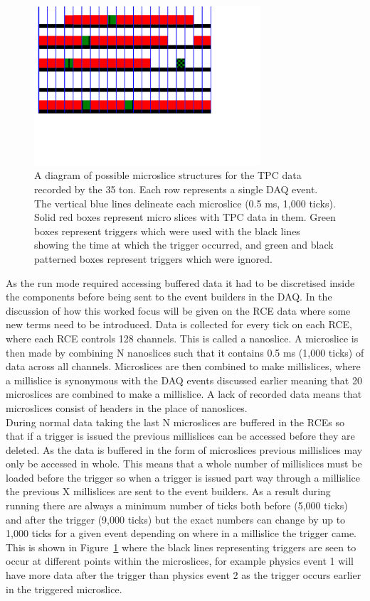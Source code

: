 \begin{figure}[h!]
  \centering
  \includegraphics[width=0.75\textwidth]{DataStructure}
  \caption[The 35 ton data structure]{A diagram of possible microslice structures for the TPC data recorded by the 35 ton. Each row represents a single DAQ event. The vertical blue lines delineate each microslice (0.5 ms, 1,000 ticks). Solid red boxes represent micro slices with TPC data in them. Green boxes represent triggers which were used with the black lines showing the time at which the trigger occurred, and green and black patterned boxes represent triggers which were ignored.}
  \label{fig:DataStructure}
\end{figure}

As the run mode required accessing buffered data it had to be discretised inside the components before being sent to the event builders in the DAQ. In the discussion of how this worked focus will be given on the RCE data where some new terms need to be introduced. Data is collected for every tick on each RCE, where each RCE controls 128 channels. This is called a nanoslice. A microslice is then made by combining N nanoslices such that it contains 0.5 ms (1,000 ticks) of data across all channels. Microslices are then combined to make millislices, where a millislice is synonymous with the DAQ events discussed earlier meaning that 20 microslices are combined to make a millislice. A lack of recorded data means that microslices consist of headers in the place of nanoslices. \\

During normal data taking the last N microslices are buffered in the RCEs so that if a trigger is issued the previous millislices can be accessed before they are deleted. As the data is buffered in the form of microslices previous millislices may only be accessed in whole. This means that a whole number of millislices must be loaded before the trigger so when a trigger is issued part way through a millislice the previous X millislices are sent to the event builders. As a result during running there are always a minimum number of ticks both before (5,000 ticks) and after the trigger (9,000 ticks) but the exact numbers can change by up to 1,000 ticks for a given event depending on where in a millislice the trigger came. This is shown in Figure~\ref{fig:DataStructure} where the black lines representing triggers are seen to occur at different points within the microslices, for example physics event 1 will have more data after the trigger than physics event 2 as the trigger occurs earlier in the triggered microslice.

